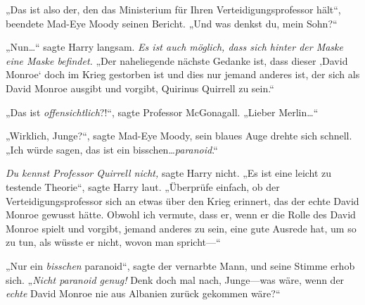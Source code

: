„Das ist also der, den das Ministerium für Ihren Verteidigungsprofessor hält“, beendete Mad-Eye Moody seinen Bericht. „Und was denkst du, mein Sohn?“

„Nun…“ sagte Harry langsam. \emph{Es ist auch möglich, dass sich hinter der Maske eine Maske befindet.} „Der naheliegende nächste Gedanke ist, dass dieser ‚David Monroe‘ doch im Krieg gestorben ist und dies nur jemand anderes ist, der sich als David Monroe ausgibt und vorgibt, Quirinus Quirrell zu sein.“

„Das ist \emph{offensichtlich}?!“, sagte Professor McGonagall. „Lieber Merlin…“

„Wirklich, Junge?“, sagte Mad-Eye Moody, sein blaues Auge drehte sich schnell. „Ich würde sagen, das ist ein bisschen…\emph{paranoid}.“

\emph{Du kennst Professor Quirrell nicht,} sagte Harry nicht.
„Es ist eine leicht zu testende Theorie“, sagte Harry laut. „Überprüfe einfach, ob der Verteidigungsprofessor sich an etwas über den Krieg erinnert, das der echte David Monroe gewusst hätte. Obwohl ich vermute, dass er, wenn er die Rolle des David Monroe spielt und vorgibt, jemand anderes zu sein, eine gute Ausrede hat, um so zu tun, als wüsste er nicht, wovon man spricht—“

„Nur ein \emph{bisschen} paranoid“, sagte der vernarbte Mann, und seine Stimme erhob sich. „\emph{Nicht paranoid genug! } Denk doch mal nach, Junge—was wäre, wenn der \emph{echte} David Monroe nie aus Albanien zurück gekommen wäre?“

